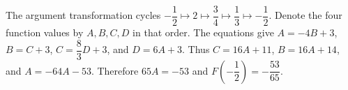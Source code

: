 The argument transformation cycles $-\dfrac{1}{2}\mapsto2\mapsto\dfrac{3}{4}\mapsto\dfrac{1}{3}\mapsto-\dfrac{1}{2}$. Denote the four function values by $A,B,C,D$ in that order. The equations give $A=-4B+3$, $B=C+3$, $C=\dfrac{8}{3}D+3$, and $D=6A+3$. Thus $C=16A+11$, $B=16A+14$, and $A=-64A-53$. Therefore $65A=-53$ and $\boxed{F(-\dfrac{1}{2})=-\dfrac{53}{65}}$.
